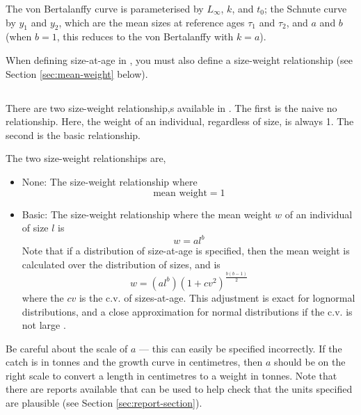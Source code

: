 The von Bertalanffy curve is parameterised by $L_\infty$, $k$, and $t_0$; the Schnute curve \citep{836} by $y_1$ and $y_2$, which are the mean sizes at reference ages $\tau_1$ and $\tau_2$, and $a$ and $b$ (when $b=1$, this reduces to the von Bertalanffy with $k=a$). 

When defining size-at-age in \SPM, you must also define a size-weight relationship (see Section \ref{sec:mean-weight} below).

\subsection{\label{sec:mean-weight}}

There are two size-weight relationship,s available in \SPM. The first is the naive no relationship. Here, the weight of an individual, regardless of size, is always 1. The second is the basic relationship. 

The two size-weight relationships are,

\begin{itemize}
  \item{None:} The size-weight relationship where  
  \begin{equation}
    \text{mean weight}=1
  \end{equation}
  \item{Basic:} The size-weight relationship where the mean weight $w$ of an individual of size $l$ is
  \begin{equation}
    w=a l^b
  \end{equation}
	Note that if a distribution of size-at-age is specified, then the mean weight is calculated over the distribution of sizes, and is
  \begin{equation}
	  w=(al^b)(1+cv^2)^{\frac{b(b-1)}{2}}
  \end{equation}
	where the $cv$ is the c.v. of sizes-at-age. This adjustment is exact for lognormal distributions, and a close approximation for normal distributions if the c.v. is not large \citep{1388}.
\end{itemize}

Be careful about the scale of $a$ --- this can easily be specified incorrectly. If the catch is in tonnes and the growth curve in centimetres, then $a$ should be on the right scale to convert a length in centimetres to a weight in tonnes. Note that there are reports available that can be used to help check that the units specified are plausible (see Section \ref{sec:report-section}).

